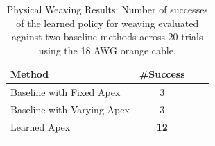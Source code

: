 \begin{table}
\vspace*{0pt}
\centering
\caption{Physical Weaving Results: Number of successes of the learned policy for weaving evaluated against two baseline methods across 20 trials using the 18 AWG orange cable.}
 \begin{tabular}{ %
l c c c}
 \toprule
  Method & \#Success\\
  \midrule
  Baseline with Fixed Apex &3\\
  Baseline with Varying Apex &3\\

  Learned Apex&\textbf{12}\\
 \bottomrule
\vspace*{-10pt}
\end{tabular}
\label{table:res_task3}

\end{table}